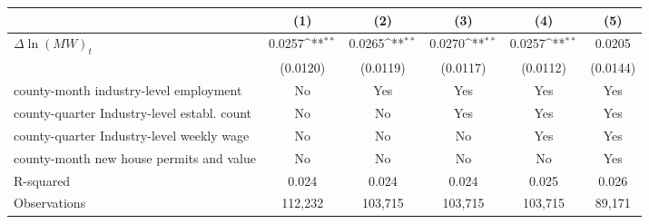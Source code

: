 {
\def\sym#1{\ifmmode^{#1}\else\(^{#1}\)\fi}
\begin{tabular}{l*{5}{c}}
\hline\hline
          &\multicolumn{1}{c}{(1)}         &\multicolumn{1}{c}{(2)}         &\multicolumn{1}{c}{(3)}         &\multicolumn{1}{c}{(4)}         &\multicolumn{1}{c}{(5)}         \\
\hline
$\Delta \ln(MW)_{t}$&   0.0257\sym{**} &   0.0265\sym{**} &   0.0270\sym{**} &   0.0257\sym{**} &   0.0205         \\
          & (0.0120)         & (0.0119)         & (0.0117)         & (0.0112)         & (0.0144)         \\
\hline
county-month industry-level employment&       No         &      Yes         &      Yes         &      Yes         &      Yes         \\
county-quarter Industry-level establ. count&       No         &       No         &      Yes         &      Yes         &      Yes         \\
county-quarter Industry-level weekly wage&       No         &       No         &       No         &      Yes         &      Yes         \\
county-month new house permits and value&       No         &       No         &       No         &       No         &      Yes         \\
R-squared &    0.024         &    0.024         &    0.024         &    0.025         &    0.026         \\
Observations&  112,232         &  103,715         &  103,715         &  103,715         &   89,171         \\
\hline\hline
\end{tabular}
}
